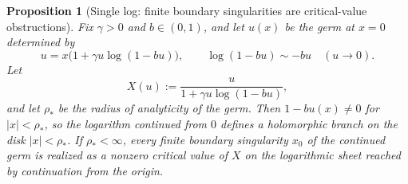 \documentclass[11pt]{amsart}
\numberwithin{equation}{section}
\theoremstyle{plain}
\newtheorem{proposition}[theorem]{Proposition}
\theoremstyle{definition}
\theoremstyle{remark}
\begin{document}
\begin{proposition}[Single log: finite boundary singularities are critical-value obstructions]
\label{prop:single-log-rho-star}
Fix \(\gamma>0\) and \(b\in(0,1)\), and let \(u(x)\) be the germ at \(x=0\) determined by
\[
u=x\bigl(1+\gamma u\log(1-bu)\bigr),
\qquad
\log(1-bu)\sim -bu
\quad (u\to0).
\]
Let
\[
X(u):=\frac{u}{1+\gamma u\log(1-bu)},
\]
and let \(\rho_*\) be the radius of analyticity of the germ. Then \(1-bu(x)\neq0\) for
\(|x|<\rho_*\), so the logarithm continued from \(0\) defines a holomorphic branch on the
disk \(|x|<\rho_*\). If \(\rho_*<\infty\), every finite boundary singularity \(x_0\) of the
continued germ is realized as a nonzero critical value of \(X\) on the logarithmic sheet
reached by continuation from the origin.
\end{proposition}
\end{document}
